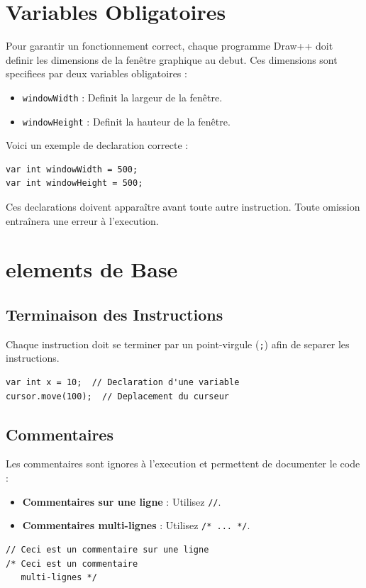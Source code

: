 \documentclass[12pt,a4paper]{report}
\begin{document}
\section{Variables Obligatoires}
Pour garantir un fonctionnement correct, chaque programme Draw++ doit definir les dimensions de la fenêtre graphique au debut. Ces dimensions sont specifiees par deux variables obligatoires :
\begin{itemize}
    \item \texttt{windowWidth} : Definit la largeur de la fenêtre.
    \item \texttt{windowHeight} : Definit la hauteur de la fenêtre.
\end{itemize}
Voici un exemple de declaration correcte :
\begin{lstlisting}[language=Draw++]
var int windowWidth = 500;
var int windowHeight = 500;
\end{lstlisting}
Ces declarations doivent apparaître avant toute autre instruction. Toute omission entraînera une erreur à l'execution.

\section{elements de Base}

\subsection{Terminaison des Instructions}
Chaque instruction doit se terminer par un point-virgule (\texttt{;}) afin de separer les instructions.
\begin{lstlisting}[language=Draw++]
var int x = 10;  // Declaration d'une variable
cursor.move(100);  // Deplacement du curseur
\end{lstlisting}

\subsection{Commentaires}
Les commentaires sont ignores à l'execution et permettent de documenter le code :
\begin{itemize}
    \item \textbf{Commentaires sur une ligne} : Utilisez \texttt{//}.
    \item \textbf{Commentaires multi-lignes} : Utilisez \texttt{/* ... */}.
\end{itemize}
\begin{lstlisting}[language=Draw++]
// Ceci est un commentaire sur une ligne
/* Ceci est un commentaire
   multi-lignes */
\end{lstlisting}
\end{document}
